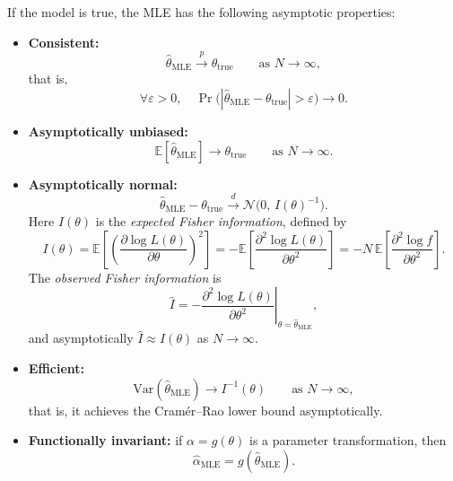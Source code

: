 \documentclass[11pt, titlepage]{article} %
\numberwithin{equation}{section}
\theoremstyle{definition}
\numberwithin{assumption}{section}
\begin{document}
If the model is true, the MLE has the following asymptotic properties:
\begin{itemize}
    \item \textbf{Consistent:}
    \begin{equation*}
        \hat{\theta}_{\mathrm{MLE}}\overset{p}{\to} \theta_{\mathrm{true}}
        \qquad \text{as } N\to\infty,
    \end{equation*}
    that is,
    \begin{equation*}
        \forall \varepsilon>0,\quad
        \Pr\bigl(|\hat{\theta}_{\mathrm{MLE}}-\theta_{\mathrm{true}}|>\varepsilon\bigr)\to 0.
    \end{equation*}

    \item \textbf{Asymptotically unbiased:}
    \begin{equation*}
        \mathbb{E}[\hat{\theta}_{\mathrm{MLE}}]\to \theta_{\mathrm{true}}
        \qquad \text{as } N\to\infty.
    \end{equation*}

    \item \textbf{Asymptotically normal:}
    \begin{equation*}
        \hat{\theta}_{\mathrm{MLE}}-\theta_{\mathrm{true}}
        \overset{d}{\longrightarrow}
        \mathcal{N}\bigl(0,\,I(\theta)^{-1}\bigr).
    \end{equation*}
    Here $I(\theta)$ is the \textit{expected Fisher information}, defined by
    \begin{equation*}
        I(\theta)
        =\mathbb{E}\!\left[\left(\frac{\partial \log L(\theta)}{\partial \theta}\right)^2\right]
        =-\mathbb{E}\!\left[\frac{\partial^2 \log L(\theta)}{\partial \theta^2}\right]
        =-N\,\mathbb{E}\!\left[\frac{\partial^2 \log f}{\partial \theta^2}\right].
    \end{equation*}
    The \textit{observed Fisher information} is
    \begin{equation*}
        \hat I
        =-\left.\frac{\partial^2 \log L(\theta)}{\partial \theta^2}\right|_{\theta=\hat{\theta}_{\mathrm{MLE}}},
    \end{equation*}
    and asymptotically $\hat I\approx I(\theta)$ as $N\to\infty$.

    \item \textbf{Efficient:}
    \begin{equation*}
        \mathrm{Var}(\hat{\theta}_{\mathrm{MLE}})\to I^{-1}(\theta)
        \qquad \text{as } N\to\infty,
    \end{equation*}
    that is, it achieves the Cram\'er--Rao lower bound asymptotically.

    \item \textbf{Functionally invariant:}
    if $\alpha=g(\theta)$ is a parameter transformation, then
    \begin{equation*}
        \hat{\alpha}_{\mathrm{MLE}}=g(\hat{\theta}_{\mathrm{MLE}}).
    \end{equation*}
\end{itemize}
\end{document}

